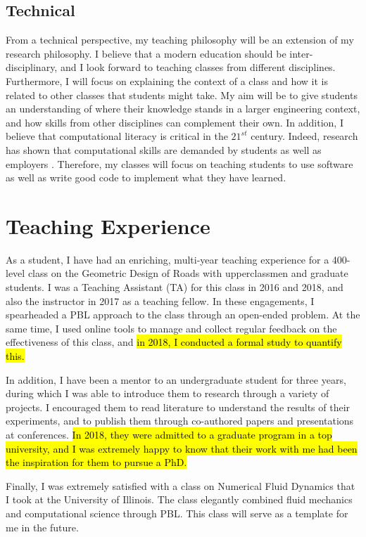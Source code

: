 \documentclass[12pt]{article}
\begin{document}
\subsection*{Technical}  
From a technical perspective, my teaching philosophy will be an extension of my research philosophy. I believe that a modern education should be inter-disciplinary, and I look forward to teaching classes from different disciplines. Furthermore, I will focus on explaining the context of a class and how it is related to other classes that students might take. My aim will be to give students an understanding of where their knowledge stands in a larger engineering context, and how skills from other disciplines can complement their own. In addition, I believe that computational literacy is critical in the $21^{st}$ century. Indeed, research has shown that computational skills are demanded by students as well as employers \cite{magana2012motivation}. Therefore, my classes will focus on teaching students to use software as well as write good code to implement what they have learned.

\section*{Teaching Experience}
As a student, I have had an enriching, multi-year teaching experience for a 400-level class on the Geometric Design of Roads with upperclassmen and graduate students. I was a Teaching Assistant (TA) for this class in 2016 and 2018, and also the instructor in 2017 as a teaching fellow. In these engagements, I spearheaded a PBL approach to the class through an open-ended problem. At the same time, I used online tools to manage and collect regular feedback on the effectiveness of this class, and \hl{in 2018, I conducted a formal study to quantify this.}

In addition, I have been a mentor to an undergraduate student for three years, during which I was able to introduce them to research through a variety of projects. I encouraged them to read literature to understand the results of their experiments, and to publish them through co-authored papers and presentations at conferences. \hl{In 2018, they were admitted to a graduate program in a top university, and I was extremely happy to know that their work with me had been the inspiration for them to pursue a PhD.}

Finally, I was extremely satisfied with a class on Numerical Fluid Dynamics that I took at the University of Illinois. The class elegantly combined fluid mechanics and computational science through PBL. This class will serve as a template for me in the future.
\end{document}
